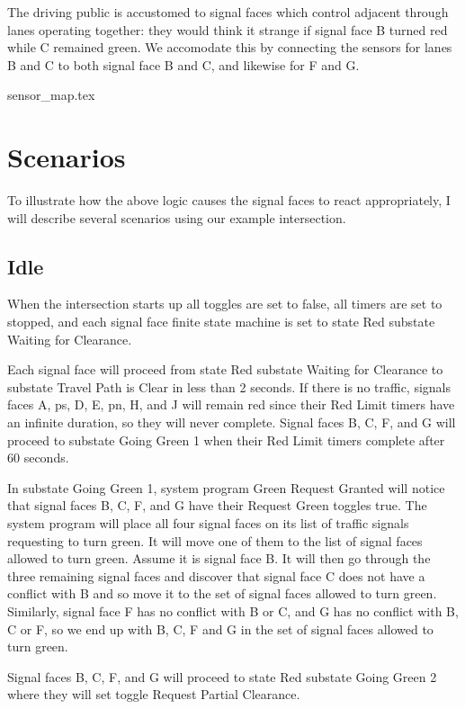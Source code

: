 \documentclass[letterpaper,twoside]{article}
\begin{document}
The driving public is accustomed to signal faces which control
adjacent through lanes operating together: they would think it strange
if signal face B turned red while C remained green.  We accomodate this
by connecting the sensors for lanes B and C to both signal face B
and C, and likewise for F and G.

 {sensor_map.tex}

\section{Scenarios}

To illustrate how the above logic causes the signal faces to react
appropriately, I will describe several scenarios using our example
intersection.

\subsection{Idle}

When the intersection starts up all toggles are set to false,
all timers are set to stopped, and each signal face finite state machine
is set to state Red substate Waiting for Clearance.

Each signal face will proceed
from state Red substate Waiting for Clearance to substate Travel Path is Clear
in less than 2 seconds.
If there is no traffic, signals faces A, ps, D, E, pn, H, and J will remain red
since their Red Limit timers have an infinite duration, so they will never
complete.
Signal faces B, C, F, and G will proceed to substate Going Green 1 when
their Red Limit timers complete after 60 seconds.

In substate Going Green 1, system program Green Request Granted will notice
that signal faces B, C, F, and G have their Request Green toggles true.
The system program will place all four signal faces on its list of traffic
signals requesting to turn green.  It will move one of them to the list
of signal faces allowed to turn green.  Assume it is signal face B.
It will then go through the three
remaining signal faces and discover that signal face C does not have
a conflict with B and so move it to the set of signal faces allowed
to turn green.  Similarly, signal face F has no conflict with B or C,
and G has no conflict with B, C or F, so we end up with B, C, F and G
in the set of signal faces allowed to turn green.

Signal faces B, C, F, and G will proceed to state Red
substate Going Green 2 where they will set toggle Request Partial Clearance.
\end{document}
